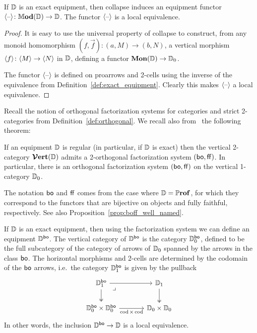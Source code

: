 \documentclass[12pt,oneside,article,draft]{memoir}
\begin{document}
\begin{proposition}\label{prop:collapse_local_equivalence}
   If $\mathbb{D}$ is an exact equipment, then collapse induces an equipment functor
   $\langle\textrm{--}\rangle\colon\mathbb{M}\mathbf{od}(\mathbb{D})\to\mathbb{D}$. The functor $\langle\textrm{--}\rangle$ is a local
   equivalence.
\end{proposition}

\begin{proof}
   It is easy to use the universal property of collapse to construct, from any monoid homomorphism
   $(f,\vec{f})\colon(a,M)\to(b,N)$, a vertical morphism $\langle f\rangle\colon\langle M\rangle\to\langle N\rangle$ in
   $\mathbb{D}$, defining a functor $\mathbf{Mon}(\mathbb{D})\to\mathbb{D}_0$.

   The functor $\langle\textrm{--}\rangle$ is defined on proarrows and 2-cells using the inverse of the
   equivalence from Definition~\ref{def:exact_equipment}. Clearly this makes $\langle\textrm{--}\rangle$ a
   local equivalence.
\end{proof}

Recall the notion of orthogonal factorization systems for categories and strict 2-categories from
Definition~\ref{def:orthogonal}. We recall also from~\cite[Theorem~4.17]{Schultz2015} the following theorem:

\begin{theorem}\label{thm:orthogonal}
   If an equipment $\mathbb{D}$ is regular (in particular, if $\mathbb{D}$ is exact)
   then the vertical 2-category $\bm{\mathcal{V}}\mathbf{ert}(\mathbb{D})$ admits a 2-orthogonal factorization system
   $(\mathsf{bo},\mathsf{ff})$. In particular, there is an orthogonal factorization system $(\mathsf{bo},\mathsf{ff})$ on the
   vertical 1-category $\mathbb{D}_0$.
\end{theorem}


The notation $\mathsf{bo}$ and $\mathsf{ff}$ comes from the case where $\mathbb{D}=\mathbb{P}\mathbf{rof}$, for which they correspond to the functors that are bijective on objects and fully faithful, respectively. See also Proposition~\ref{prop:boff_well_named}.

If $\mathbb{D}$ is an exact equipment, then using the factorization system we can define an equipment
$\mathbb{D}^{\mathsf{bo}}$. The vertical category of $\mathbb{D}^{\mathsf{bo}}$ is the category $\mathbb{D}_0^{\mathsf{bo}}$,
defined to be the full subcategory of the category of arrows of $\mathbb{D}_0$ spanned by the arrows
in the class $\mathsf{bo}$. The horizontal morphisms and 2-cells are determined by the codomain of the
$\mathsf{bo}$ arrows, i.e.~the category $\mathbb{D}_1^{\mathsf{bo}}$ is given by the pullback
\begin{equation*}
\begin{tikzcd}[column sep=large]
   \dcat{D}_1^{\bo} \ar[r] \ar[d, two heads] \ar[dr,phantom,"\lrcorner" very near start]
      & \dcat{D}_1 \ar[d, two heads] \\
   \dcat{D}_0^{\bo}\times\dcat{D}_0^{\bo} \ar[r,"\cod\times\cod"']
      & \dcat{D}_0\times\dcat{D}_0
\end{tikzcd}
\end{equation*}
In other words, the inclusion $\mathbb{D}^{\mathsf{bo}}\to\mathbb{D}$ is a local equivalence.
\end{document}
